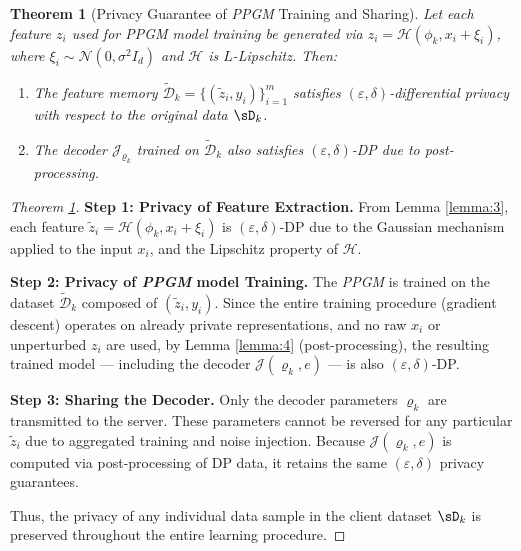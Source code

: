 \documentclass[lettersize,journal]{IEEEtran}
\newtheorem{theorem}{Theorem}
\newtheorem{proof}{Proof}
\begin{document}
\begin{theorem}[Privacy Guarantee of \emph{PPGM} Training and Sharing]
\label{theo:4}
Let each feature $z_i$ used for \emph{PPGM} model training be generated via $z_i = \mathcal{H}( \phi_k, x_i + \xi_i)$, where $\xi_i \sim \mathcal{N}(0, \sigma^2 I_d)$ and $\mathcal{H}$ is $L$-Lipschitz. Then:

\begin{enumerate}
    \item The feature memory $\tilde{\mathcal{D}}_k = \{(\tilde{z}_i, y_i)\}_{i=1}^m$ satisfies $(\varepsilon, \delta)$-differential privacy with respect to the original data $\sD_k$.
    \item The decoder $\mathcal{J}_{\varrho_k}$ trained on $\tilde{\mathcal{D}}_k$ also satisfies $(\varepsilon, \delta)$-DP due to post-processing.
\end{enumerate}
\end{theorem}

\begin{proof}[Theorem \ref{theo:4}]

\textbf{Step 1: Privacy of Feature Extraction.}  
From Lemma \ref{lemma:3}, each feature $\tilde{z}_i = \mathcal{H}(\phi_k, x_i + \xi_i)$ is $(\varepsilon, \delta)$-DP due to the Gaussian mechanism applied to the input $x_i$, and the Lipschitz property of $\mathcal{H}$.

\textbf{Step 2: Privacy of \emph{PPGM} model Training.}  
The \emph{PPGM} is trained on the dataset $\tilde{\mathcal{D}}_k$ composed of $(\tilde{z}_i, y_i)$. Since the entire training procedure (gradient descent) operates on already private representations, and no raw $x_i$ or unperturbed $z_i$ are used, by Lemma \ref{lemma:4} (post-processing), the resulting trained model — including the decoder $\mathcal{J}(\varrho_k,e)$ — is also $(\varepsilon, \delta)$-DP.

\textbf{Step 3: Sharing the Decoder.}  
Only the decoder parameters $\varrho_k$ are transmitted to the server. These parameters cannot be reversed for any particular $\tilde{z}_i$ due to aggregated training and noise injection. Because $\mathcal{J}(\varrho_k,e)$ is computed via post-processing of DP data, it retains the same $(\varepsilon, \delta)$ privacy guarantees.

Thus, the privacy of any individual data sample in the client dataset $\sD_k$ is preserved throughout the entire learning procedure.
\end{proof}






\end{document}
